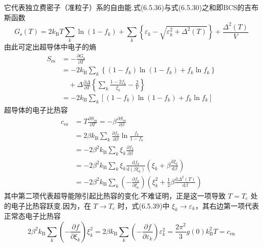 它代表独立费密子（准粒子）系的自由能.式(6.5.36)与式(6.5.30)之和即BCS的吉布斯函数
\begin{equation}
  G_{\mathrm{s}}(T)=2k_{\mathrm{B}}T\sum_{k}\ln\left(1-f_{k}\right)
  +\sum_{k}\left\{\varepsilon_{k}
  -\sqrt{\varepsilon_{k}^{2}+\Delta^{2}(T)}\right\}
  +\frac{\Delta^{2}(T)}{V}
\end{equation}
由此可定出超导体中电子的熵
\begin{equation}
\begin{aligned}
  S_{\mathrm{es}}&=-\frac{\partial G_{\mathrm{s}}}{\partial T}\\
  &=-2k_{\mathrm{B}}\sum_{k}\left\{(1-f_{k})\ln(1-f_{k})
  +f_{k}\ln f_{k}\right\}\\
  &\quad+\Delta\frac{\partial\Delta}{\partial T}
  \left\{\sum_{k}\frac{1-2f_{k}}{\xi_{k}}-\frac{2}{V}\right\}\\
  &=-2k_{\mathrm{B}}\sum_{k}\left[(1-f_{k})\ln(1-f_{k})+f_{k}\ln f_{k}\right]
\end{aligned}
\end{equation}
超导体的电子比热容
\begin{equation}
\begin{aligned}
  c_{\mathrm{es}}&=T\frac{\partial S_{\mathrm{es}}}{\partial T}
  =-\beta\frac{\partial S_{\mathrm{es}}}{\partial\beta}\\
  &=2\beta k_{\mathrm{B}}\sum_{k}\frac{\partial f_{k}}{\partial\beta}
  \ln\frac{f_{k}}{1-f_{k}}\\
  &=-2\beta^{2}k_{\mathrm{B}}\sum_{k}\xi_{k}\frac{\partial f_{k}}{\partial\beta}\\
  &=-2\beta^{2}k_{\mathrm{B}}\sum_{k}\xi_{k}
  \frac{\mathrm{d}f_{k}}{\mathrm{d}\left(\beta\xi_{k}\right)}
  \left(\xi_{k}+\beta\frac{\mathrm{d}\xi_{k}}{\mathrm{d}\beta}\right)\\
  &=-2\beta^{2}k_{\mathrm{B}}\sum_{k}\left(-\frac{\partial f_{k}}{\partial\xi_{k}}\right)
  \left(\xi_{k}^{2}+\frac{1}{2}\beta\frac{\mathrm{d}\Delta^{2}(T)}{\mathrm{d}\beta}\right)
\end{aligned}
\end{equation}
其中第二项代表超导能隙引起比热容的变化.不难证明，正是这一项导致 $T=T_{\mathrm{c}}$ 处的电子比热容跃变.因为，在 $T\to T_{\mathrm{c}}$ 时，式(6.5.39)中 $\xi_{k}\to\varepsilon_{k}$，其右边第一项代表正常态电子比热容
\begin{equation}
  2\beta^{2}k_{\mathrm{B}}\sum_{k}\left(-\frac{\partial f}{\partial\xi_{k}}\right)\xi_{k}^{2}
  =2\beta k_{\mathrm{B}}\sum_{k}\left(-\frac{\partial f}{\partial\varepsilon_{k}}\right)
  \varepsilon_{k}^{2}
  =\frac{2\pi^{2}}{3}g(0)k_{\mathrm{B}}^{2}T=c_{\mathrm{en}}
\end{equation}
